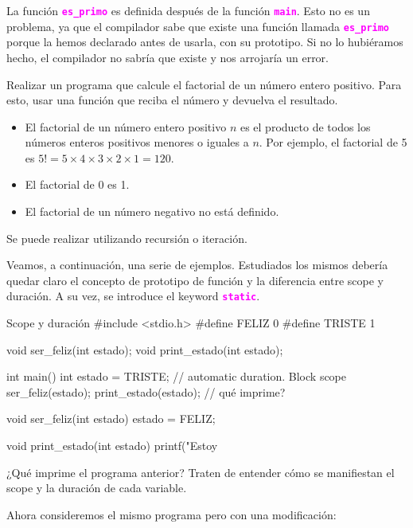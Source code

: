 \documentclass[]{scrartcl}
\newcommand{\hl}[1]{\textcolor{magenta}{\textbf{\texttt{#1}}}}
\begin{document}
La función \hl{es\_primo} es definida después de la función \hl{main}. Esto no es un problema, ya que el compilador sabe que existe una función llamada \hl{es\_primo} porque la hemos declarado antes de usarla, con su prototipo. Si no lo hubiéramos hecho, el compilador no sabría que existe y nos arrojaría un error.

\begin{exbox}
  Realizar un programa que calcule el factorial de un número entero positivo. Para esto, usar una función que reciba el número y devuelva el resultado.
  \begin{itemize}
    \item El factorial de un número entero positivo $n$ es el producto de todos los números enteros positivos menores o iguales a $n$. Por ejemplo, el factorial de 5 es $5! = 5 \times 4 \times 3 \times 2 \times 1 = 120$.
    \item El factorial de 0 es 1.
    \item El factorial de un número negativo no está definido.
  \end{itemize}
  Se puede realizar utilizando recursión o iteración.
\end{exbox}

Veamos, a continuación, una serie de ejemplos. Estudiados los mismos debería quedar claro el concepto de prototipo de función y la diferencia entre scope y duración. A su vez, se introduce el keyword \hl{static}.

\begin{cbox}[]{Scope y duración}
  #include <stdio.h>
  #define FELIZ 0
  #define TRISTE 1
  
  void ser_feliz(int estado);
  void print_estado(int estado);
  
  int main(){
    int estado = TRISTE; // automatic duration. Block scope
    ser_feliz(estado);
    print_estado(estado); // qué imprime?
  }
  
  void ser_feliz(int estado){
    estado = FELIZ;
  }

  void print_estado(int estado){
    printf("Estoy %
  }
\end{cbox}

\begin{exbox}
  ¿Qué imprime el programa anterior? Traten de entender cómo se manifiestan el scope y la duración de cada variable. 
\end{exbox}

Ahora consideremos el mismo programa pero con una modificación:
\end{document}
